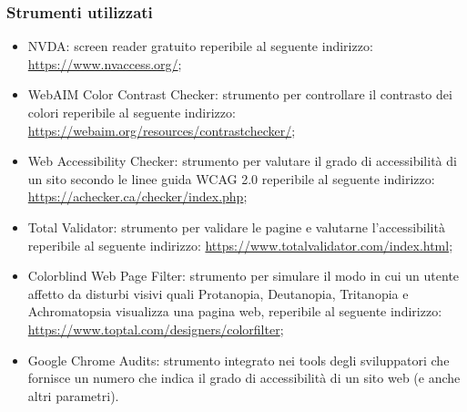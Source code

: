 \documentclass[12pt]{article}
\begin{document}
	\subsubsection{Strumenti utilizzati}
		\begin{itemize}
			\item NVDA: screen reader gratuito reperibile al seguente indirizzo: \url{https://www.nvaccess.org/};
			\item WebAIM Color Contrast Checker: strumento per controllare il contrasto dei colori reperibile al seguente indirizzo: \url{https://webaim.org/resources/contrastchecker/};
			\item Web Accessibility Checker: strumento per valutare il grado di accessibilità di un sito secondo le linee guida WCAG 2.0 reperibile al seguente indirizzo: \url{https://achecker.ca/checker/index.php};
			\item Total Validator: strumento per validare le pagine e valutarne l'accessibilità reperibile al seguente indirizzo: \url{https://www.totalvalidator.com/index.html};
			\item Colorblind Web Page Filter: strumento per simulare il modo in cui un utente affetto da disturbi visivi quali Protanopia, Deutanopia, Tritanopia e Achromatopsia visualizza una pagina web, reperibile al seguente indirizzo: \url{https://www.toptal.com/designers/colorfilter};
			\item Google Chrome Audits: strumento integrato nei tools degli sviluppatori che fornisce un numero che indica il grado di accessibilità di un sito web (e anche altri parametri).
		\end{itemize}
\end{document}
